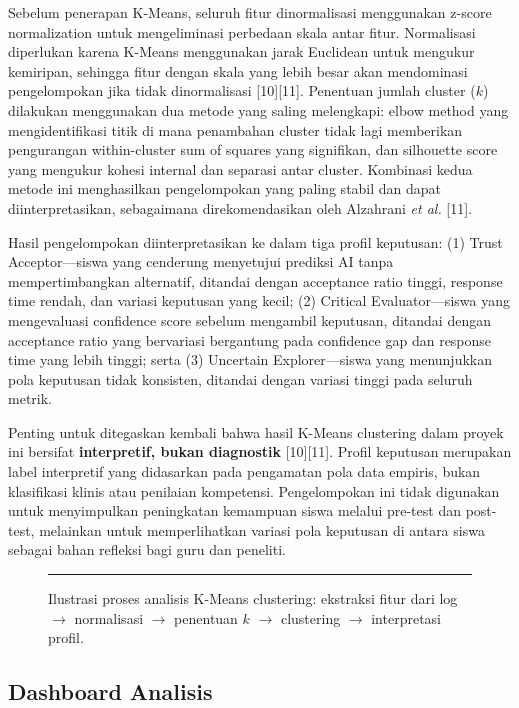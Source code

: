 \documentclass[12pt,oneside]{report}
\begin{document}
Sebelum penerapan K-Means, seluruh fitur dinormalisasi menggunakan z-score normalization untuk mengeliminasi perbedaan skala antar fitur. Normalisasi diperlukan karena K-Means menggunakan jarak Euclidean untuk mengukur kemiripan, sehingga fitur dengan skala yang lebih besar akan mendominasi pengelompokan jika tidak dinormalisasi [10][11]. Penentuan jumlah cluster ($k$) dilakukan menggunakan dua metode yang saling melengkapi: elbow method yang mengidentifikasi titik di mana penambahan cluster tidak lagi memberikan pengurangan within-cluster sum of squares yang signifikan, dan silhouette score yang mengukur kohesi internal dan separasi antar cluster. Kombinasi kedua metode ini menghasilkan pengelompokan yang paling stabil dan dapat diinterpretasikan, sebagaimana direkomendasikan oleh Alzahrani \textit{et al.} [11].

Hasil pengelompokan diinterpretasikan ke dalam tiga profil keputusan: (1) Trust Acceptor—siswa yang cenderung menyetujui prediksi AI tanpa mempertimbangkan alternatif, ditandai dengan acceptance ratio tinggi, response time rendah, dan variasi keputusan yang kecil; (2) Critical Evaluator—siswa yang mengevaluasi confidence score sebelum mengambil keputusan, ditandai dengan acceptance ratio yang bervariasi bergantung pada confidence gap dan response time yang lebih tinggi; serta (3) Uncertain Explorer—siswa yang menunjukkan pola keputusan tidak konsisten, ditandai dengan variasi tinggi pada seluruh metrik.

Penting untuk ditegaskan kembali bahwa hasil K-Means clustering dalam proyek ini bersifat \textbf{interpretif, bukan diagnostik} [10][11]. Profil keputusan merupakan label interpretif yang didasarkan pada pengamatan pola data empiris, bukan klasifikasi klinis atau penilaian kompetensi. Pengelompokan ini tidak digunakan untuk menyimpulkan peningkatan kemampuan siswa melalui pre-test dan post-test, melainkan untuk memperlihatkan variasi pola keputusan di antara siswa sebagai bahan refleksi bagi guru dan peneliti.

\begin{figure}[H]
\centering
\rule{0.8\textwidth}{6cm}
\caption{Ilustrasi proses analisis K-Means clustering: ekstraksi fitur dari log $\rightarrow$ normalisasi $\rightarrow$ penentuan $k$ $\rightarrow$ clustering $\rightarrow$ interpretasi profil.}
\label{fig:kmeans-proses}
\end{figure}

\subsection{Dashboard Analisis}
\label{subsec:dashboard}
\end{document}
